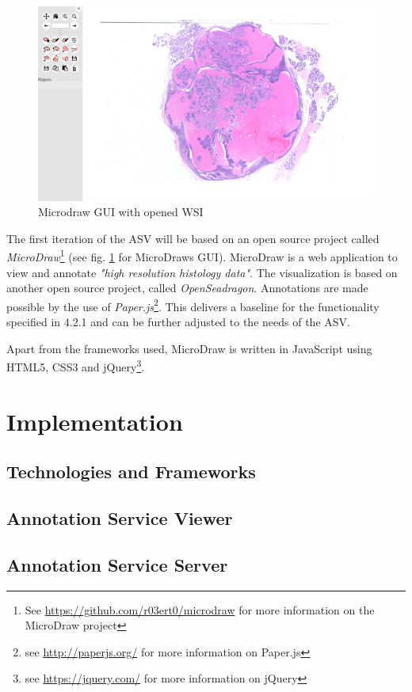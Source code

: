 \begin{figure}[H]
	\begin{center}
		\includegraphics[scale=0.2]{img/microdrawUI.png}
		\caption{Microdraw GUI with opened WSI}
		\label{fig4_microdrawUI}
	\end{center}
\end{figure}

The first iteration of the ASV will be based on an open source project called \emph{MicroDraw}\footnote{See \url{https://github.com/r03ert0/microdraw} for more information on the MicroDraw project} (see fig. \ref{fig4_microdrawUI} for MicroDraws GUI).  MicroDraw is a web application to view and annotate \emph{"high resolution histology data"}\cite{web:microdraw2}. The visualization is based on another open source project, called \emph{OpenSeadragon}\cite{web:openseadragon}. Annotations are made possible by the use of \emph{Paper.js}\footnote{see \url{http://paperjs.org/} for more information on Paper.js}. This delivers a baseline for the functionality specified in 4.2.1 and can be further adjusted to the needs of the ASV.

Apart from the frameworks used, MicroDraw is written in JavaScript using HTML5, CSS3 and jQuery\footnote{see \url{https://jquery.com/} for more information on jQuery}.


\section{Implementation}
\subsection{Technologies and Frameworks}
\subsection{Annotation Service Viewer}
\subsection{Annotation Service Server}
